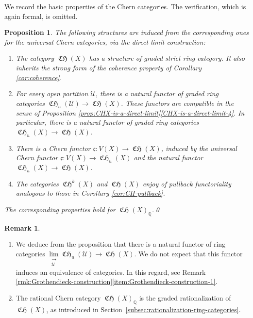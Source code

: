 \documentclass[11pt]{article}
\newcommand{\skpt}{\smallskip}
\theoremstyle{plain}
\newtheorem{proposition}[theorem]{Proposition}
\theoremstyle{definition}
\newtheorem{remark}[theorem]{Remark}
\newcommand{\QBbb}{\mathbb Q}
\newcommand{\Ucal}{\mathcal U}
\newcommand{\cfrak}{\mathfrak c}
\DeclareMathOperator{\CHfrak}{\mathfrak{CH}}
\begin{document}
We record the basic properties of the Chern categories. The verification, which is again formal, is omitted.
\begin{proposition}\label{prop:formal-properties-CH-quasi-compact}
The following structures are induced from the corresponding ones for the universal Chern categories, via the direct limit construction:
\begin{enumerate}
\item\label{item:formal-properties-CH-quasi-compact-1} The category $\CHfrak(X)$ has a structure of graded strict ring category. It also inherits the strong form of the coherence property of Corollary \ref{cor:coherence}.
\item\label{item:formal-properties-CH-quasi-compact-2} For every open partition $\Ucal$, there is a natural functor of graded ring categories $\CHfrak_{u}(\Ucal)\to\CHfrak(X)$. These functors are compatible in the sense of Proposition \ref{prop:CHX-is-a-direct-limit}\eqref{CHX-is-a-direct-limit-4}. In particular, there is a natural functor of graded ring categories $\CHfrak_{u}(X)\to\CHfrak(X)$.
\item\label{item:formal-properties-CH-quasi-compact-5} There is a Chern functor $\cfrak\colon V(X)\to\CHfrak(X)$, induced by the universal Chern functor $\cfrak\colon V(X)\to\CHfrak_{u}(X)$ and the natural functor $\CHfrak_{u}(X)\to\CHfrak(X)$.
\item\label{item:formal-properties-CH-quasi-compact-6} The categories $\CHfrak^{k}(X)$ and $\CHfrak(X)$ enjoy of pullback functoriality analogous to those in Corollary \ref{cor:CH-pullback}.
\end{enumerate}
The corresponding properties hold for $\CHfrak(X)_{\QBbb}$.\qed
\end{proposition}

\skpt
\begin{remark}
\begin{enumerate}
\item We deduce from the proposition that there is a natural functor of ring categories $\underset{\substack{\longrightarrow\\ \Ucal}}{\lim}\CHfrak_{u}(\Ucal)\to\CHfrak(X)$. We do not expect that this functor induces an equivalence of categories. In this regard, see Remark \eqref{rmk:Grothendieck-construction}\eqref{item:Grothendieck-construction-1}.
\item The rational Chern category $\CHfrak(X)_{\QBbb}$ is the graded rationalization of $\CHfrak(X)$, as introduced in Section~\ref{subsec:rationalization-ring-categories}.
\end{enumerate}
\end{remark}
\end{document}

